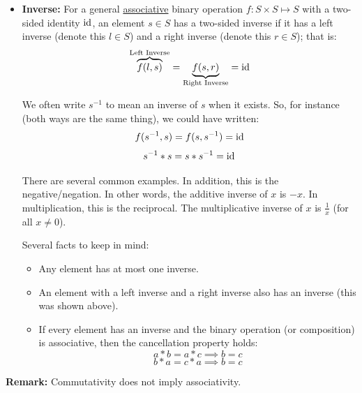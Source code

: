 \documentclass[letterpaper]{article}
\begin{document}
\begin{itemize}
    \item \textbf{Inverse:} For a general \underline{associative} binary operation $f: S \times S \mapsto S$ with a two-sided identity $\operatorname{id}$, an element $s \in S$ has a two-sided inverse if it has a left inverse (denote this $l \in S$) and a right inverse (denote this $r \in S$); that is: 
    \[\overbrace{f(l, s)}^{\text{Left Inverse}} = \underbrace{f(s, r)}_{\text{Right Inverse}} = \operatorname{id}\]

    \bigskip 

    We often write $s^{-1}$ to mean an inverse of $s$ when it exists. So, for instance (both ways are the same thing), we could have written: 
    \[f(s^{-1}, s) = f(s, s^{-1}) = \operatorname{id}\]
    \[s^{-1} * s = s * s^{-1} = \operatorname{id}\]

    \bigskip 

    There are several common examples. In addition, this is the negative/negation. In other words, the additive inverse of $x$ is $-x$. In multiplication, this is the reciprocal. The multiplicative inverse of $x$ is $\frac{1}{x}$ (for all $x \neq 0$). 
    
    \bigskip 
    
    Several facts to keep in mind: 
    \begin{itemize}
        \item Any element has at most one inverse. 
        \item An element with a left inverse and a right inverse also has an inverse (this was shown above). 
        \item If every element has an inverse and the binary operation (or composition) is associative, then the cancellation property holds: 
        \[a * b = a * c \implies b = c\]
        \[b * a = c * a \implies b = c\]
    \end{itemize}
\end{itemize}

\textbf{Remark:} Commutativity does not imply associativity.

\newpage 
\end{document}
